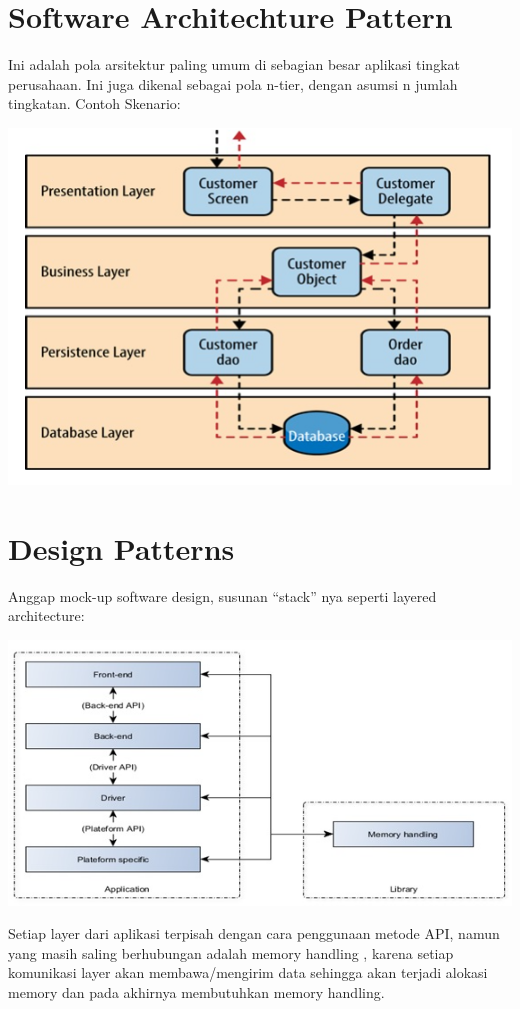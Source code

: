 \documentclass[a4paper,12pt]{article}
\begin{document}
\section*{Software Architechture Pattern}
Ini adalah pola arsitektur paling umum di sebagian besar aplikasi tingkat perusahaan. Ini juga dikenal sebagai pola n-tier, dengan asumsi n jumlah tingkatan. Contoh Skenario:

\includegraphics{Img/Software Architecture Pattern.png}


\section*{Design Patterns}

Anggap mock-up software design, susunan “stack” nya seperti layered architecture:

\includegraphics{Img/Design Pattern.png}

Setiap layer dari aplikasi terpisah dengan cara penggunaan metode API, namun yang masih saling berhubungan adalah memory handling , karena setiap komunikasi layer akan membawa/mengirim data sehingga akan terjadi alokasi memory dan pada akhirnya membutuhkan memory handling.
\end{document}
